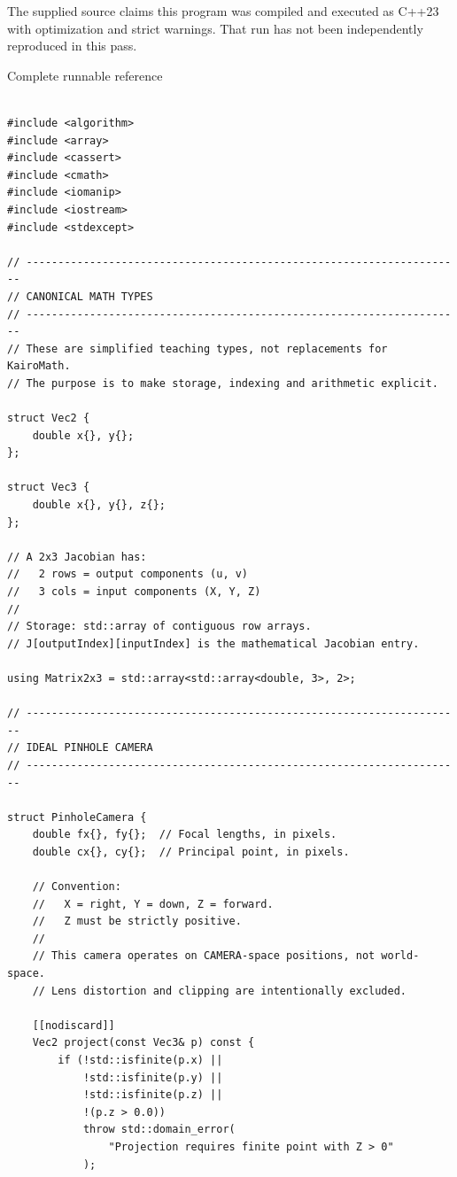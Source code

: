 The supplied source claims this program was compiled and executed as C++23 with optimization and strict warnings. That run has not been independently reproduced in this pass.


Complete runnable reference

\begin{verbatim}

#include <algorithm>
#include <array>
#include <cassert>
#include <cmath>
#include <iomanip>
#include <iostream>
#include <stdexcept>

// ---------------------------------------------------------------------
// CANONICAL MATH TYPES
// ---------------------------------------------------------------------
// These are simplified teaching types, not replacements for KairoMath.
// The purpose is to make storage, indexing and arithmetic explicit.

struct Vec2 {
    double x{}, y{};
};

struct Vec3 {
    double x{}, y{}, z{};
};

// A 2x3 Jacobian has:
//   2 rows = output components (u, v)
//   3 cols = input components (X, Y, Z)
//
// Storage: std::array of contiguous row arrays.
// J[outputIndex][inputIndex] is the mathematical Jacobian entry.

using Matrix2x3 = std::array<std::array<double, 3>, 2>;

// ---------------------------------------------------------------------
// IDEAL PINHOLE CAMERA
// ---------------------------------------------------------------------

struct PinholeCamera {
    double fx{}, fy{};  // Focal lengths, in pixels.
    double cx{}, cy{};  // Principal point, in pixels.

    // Convention:
    //   X = right, Y = down, Z = forward.
    //   Z must be strictly positive.
    //
    // This camera operates on CAMERA-space positions, not world-space.
    // Lens distortion and clipping are intentionally excluded.

    [[nodiscard]]
    Vec2 project(const Vec3& p) const {
        if (!std::isfinite(p.x) ||
            !std::isfinite(p.y) ||
            !std::isfinite(p.z) ||
            !(p.z > 0.0))
            throw std::domain_error(
                "Projection requires finite point with Z > 0"
            );


\end{verbatim}
